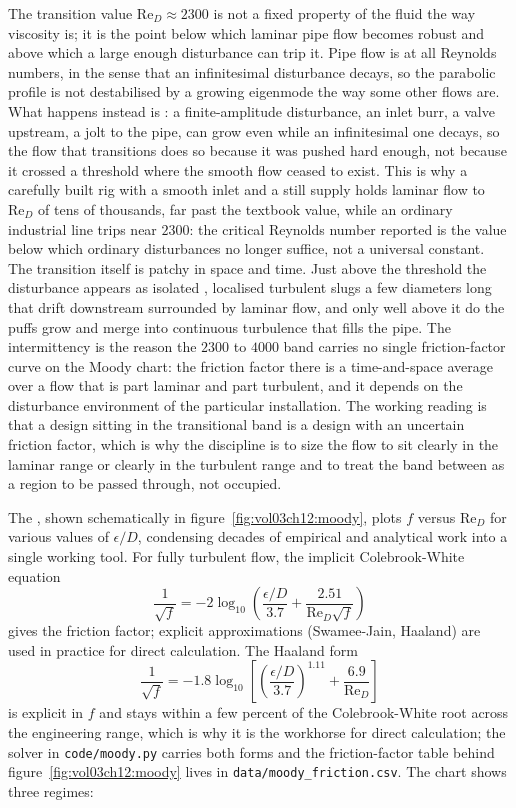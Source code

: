 The transition value $\text{Re}_D\approx2300$ is not a fixed property of
the fluid the way viscosity is; it is the point below which laminar pipe
flow becomes robust and above which a large enough disturbance can trip
it. Pipe flow is  at all Reynolds numbers, in
the sense that an infinitesimal disturbance decays, so the parabolic
profile is not destabilised by a growing eigenmode the way some other
flows are. What happens instead is : a
finite-amplitude disturbance, an inlet burr, a valve upstream, a jolt to
the pipe, can grow even while an infinitesimal one decays, so the flow
that transitions does so because it was pushed hard enough, not because
it crossed a threshold where the smooth flow ceased to exist. This is why
a carefully built rig with a smooth inlet and a still supply holds
laminar flow to $\text{Re}_D$ of tens of thousands, far past the
textbook value, while an ordinary industrial line trips near $2300$: the
critical Reynolds number reported is the value below which ordinary
disturbances no longer suffice, not a universal constant. The transition
itself is patchy in space and time. Just above the threshold the
disturbance appears as isolated , localised turbulent
slugs a few diameters long that drift downstream surrounded by laminar
flow, and only well above it do the puffs grow and merge into continuous
turbulence that fills the pipe. The intermittency is the reason the
$2300$ to $4000$ band carries no single friction-factor curve on the
Moody chart: the friction factor there is a time-and-space average over a
flow that is part laminar and part turbulent, and it depends on the
disturbance environment of the particular installation. The working
reading is that a design sitting in the transitional band is a design
with an uncertain friction factor, which is why the discipline is to size
the flow to sit clearly in the laminar range or clearly in the turbulent
range and to treat the band between as a region to be passed through, not
occupied.



The 
\cite{paper:moody-1944,text:white-fluid-mechanics}, shown
schematically in figure~\ref{fig:vol03ch12:moody},
plots $f$ versus $\text{Re}_D$ for various values of $\epsilon/D$,
condensing decades of empirical and analytical work into a single
working tool. For fully turbulent flow, the
implicit Colebrook-White equation \cite{paper:colebrook-1939}
\[
\frac{1}{\sqrt{f}} = -2\log_{10}\left(\frac{\epsilon/D}{3.7} +
\frac{2.51}{\text{Re}_D\sqrt{f}}\right)
\]
gives the friction factor; explicit approximations (Swamee-Jain,
Haaland) are used in practice for direct calculation. The Haaland
form
\[
\frac{1}{\sqrt{f}} = -1.8\log_{10}\!\left[
\left(\frac{\epsilon/D}{3.7}\right)^{1.11} +
\frac{6.9}{\text{Re}_D}\right]
\]
is explicit in $f$ and stays within a few percent of the
Colebrook-White root across the engineering range, which is why it
is the workhorse for direct calculation; the solver in
\texttt{code/moody.py} carries both forms and the friction-factor
table behind figure~\ref{fig:vol03ch12:moody} lives in
\texttt{data/moody\_friction.csv}. The chart
shows three regimes:

